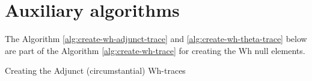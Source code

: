 \chapter{Auxiliary algorithms}
\label{ch:extra-pseudo-code}

The Algorithm \ref{alg:create-wh-adjunct-trace} and \ref{alg:create-wh-theta-trace} below are part of the Algorithm \ref{alg:create-wh-trace} for creating the Wh null elements. 

\begin{algorithm}[!ht]
    \Input {\whGroup, \dg, \cg}
    \caption{Creating the Adjunct (circumstantial) Wh-traces}
    \label{alg:create-wh-adjunct-trace}
\end{algorithm}



